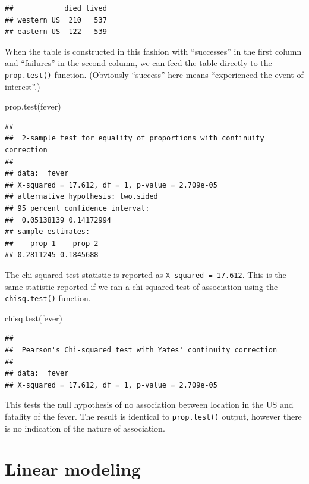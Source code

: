 \documentclass[
]{book}
\newenvironment{Shaded}{\begin{snugshade}}{\end{snugshade}}
\newcommand{\FunctionTok}[1]{\textcolor[rgb]{0.00,0.00,0.00}{#1}}
\newcommand{\NormalTok}[1]{#1}
\begin{document}
\begin{verbatim}
##            died lived
## western US  210   537
## eastern US  122   539
\end{verbatim}

When the table is constructed in this fashion with ``successes'' in the first column and ``failures'' in the second column, we can feed the table directly to the \texttt{prop.test()} function. (Obviously ``success'' here means ``experienced the event of interest''.)

\begin{Shaded}
\begin{Highlighting}[]
\FunctionTok{prop.test}\NormalTok{(fever)}
\end{Highlighting}
\end{Shaded}

\begin{verbatim}
## 
##  2-sample test for equality of proportions with continuity correction
## 
## data:  fever
## X-squared = 17.612, df = 1, p-value = 2.709e-05
## alternative hypothesis: two.sided
## 95 percent confidence interval:
##  0.05138139 0.14172994
## sample estimates:
##    prop 1    prop 2 
## 0.2811245 0.1845688
\end{verbatim}

The chi-squared test statistic is reported as \texttt{X-squared\ =\ 17.612}. This is the same statistic reported if we ran a chi-squared test of association using the \texttt{chisq.test()} function.

\begin{Shaded}
\begin{Highlighting}[]
\FunctionTok{chisq.test}\NormalTok{(fever)}
\end{Highlighting}
\end{Shaded}

\begin{verbatim}
## 
##  Pearson's Chi-squared test with Yates' continuity correction
## 
## data:  fever
## X-squared = 17.612, df = 1, p-value = 2.709e-05
\end{verbatim}

This tests the null hypothesis of no association between location in the US and fatality of the fever. The result is identical to \texttt{prop.test()} output, however there is no indication of the nature of association.

\hypertarget{linear-modeling}{%
\section{Linear modeling}\label{linear-modeling}}
\end{document}

